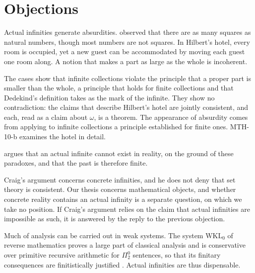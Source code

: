 \documentclass{situationist-preprint}
\begin{document}
\section{Objections}

\begin{objection}[Paradoxes]
Actual infinities generate absurdities. \citet{Galileo1638} observed that there are as many squares as natural numbers, though most numbers are not squares. In Hilbert's hotel, every room is occupied, yet a new guest can be accommodated by moving each guest one room along. A notion that makes a part as large as the whole is incoherent.
\end{objection}

\begin{reply}
The cases show that infinite collections violate the principle that a proper part is smaller than the whole, a principle that holds for finite collections and that Dedekind's definition takes as the mark of the infinite. They show no contradiction: the claims that describe Hilbert's hotel are jointly consistent, and each, read as a claim about $\omega$, is a theorem. The appearance of absurdity comes from applying to infinite collections a principle established for finite ones. MTH-10-b examines the hotel in detail.
\end{reply}

\begin{objection}[Kalām]
\citet{Craig1979} argues that an actual infinite cannot exist in reality, on the ground of these paradoxes, and that the past is therefore finite.
\end{objection}

\begin{reply}
Craig's argument concerns concrete infinities, and he does not deny that set theory is consistent. Our thesis concerns mathematical objects, and whether concrete reality contains an actual infinity is a separate question, on which we take no position. If Craig's argument relies on the claim that actual infinities are impossible as such, it is answered by the reply to the previous objection.
\end{reply}

\begin{objection}[Finitism]
Much of analysis can be carried out in weak systems. The system $\mathrm{WKL}_0$ of reverse mathematics proves a large part of classical analysis and is conservative over primitive recursive arithmetic for $\Pi^0_2$ sentences, so that its finitary consequences are finitistically justified \citep{Simpson2009,Tait1981}. Actual infinities are thus dispensable.
\end{objection}
\end{document}
